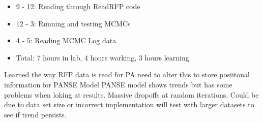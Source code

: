 \documentclass[12pt,hyperref]{labbook}
\begin{document}
\begin{itemize}
    \item 9 - 12: Reading through ReadRFP code
    \item 12 - 3: Running and testing MCMCs
    \item 4 - 5: Reading MCMC Log data
    \item Total: 7 hours in lab, 4 hours working, 3 hours learning
\end{itemize}
Learned the way RFP data is read for PA need to alter this to store posiitonal information for PANSE Model
PANSE model shows trends but has some problems when loking at results. Massive dropoffs at random iterations. Could be due to data set size or incorrect implementation will test with larger datasets to see if trend persists.
\end{document}
